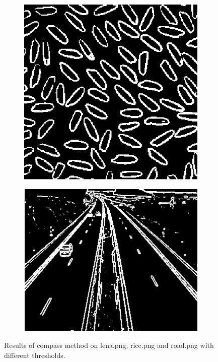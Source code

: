 \documentclass{article}
\begin{document}
\begin{figure}
\begin{subfigure}[b]{0.32\textwidth}
            \includegraphics[width=\textwidth]{Images/rice_compass.png}
        \end{subfigure}
        \hfill
        \begin{subfigure}[b]{0.32\textwidth}
            \includegraphics[width=\textwidth]{Images/road_compass.png}
        \end{subfigure}
        \caption{Results of compass method on \textsf{lena.png}, \textsf{rice.png} and \textsf{road.png} with different thresholds.}
        \label{fig:compass}
\end{figure}
\end{document}
